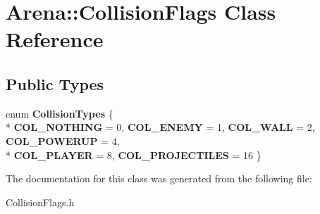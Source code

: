\hypertarget{class_arena_1_1_collision_flags}{\section{Arena\+:\+:Collision\+Flags Class Reference}
\label{class_arena_1_1_collision_flags}
}
\subsection*{Public Types}
\begin{DoxyCompactItemize}
\item 
\hypertarget{class_arena_1_1_collision_flags_af9df46e67d2e81cc45f99ab1bf06b3e1}{enum {\bfseries Collision\+Types} \{ \\*
{\bfseries C\+O\+L\+\_\+\+N\+O\+T\+H\+I\+N\+G} = 0, 
{\bfseries C\+O\+L\+\_\+\+E\+N\+E\+M\+Y} = 1, 
{\bfseries C\+O\+L\+\_\+\+W\+A\+L\+L} = 2, 
{\bfseries C\+O\+L\+\_\+\+P\+O\+W\+E\+R\+U\+P} = 4, 
\\*
{\bfseries C\+O\+L\+\_\+\+P\+L\+A\+Y\+E\+R} = 8, 
{\bfseries C\+O\+L\+\_\+\+P\+R\+O\+J\+E\+C\+T\+I\+L\+E\+S} = 16
 \}}\label{class_arena_1_1_collision_flags_af9df46e67d2e81cc45f99ab1bf06b3e1}

\end{DoxyCompactItemize}


The documentation for this class was generated from the following file\+:\begin{DoxyCompactItemize}
\item 
Collision\+Flags.\+h\end{DoxyCompactItemize}
